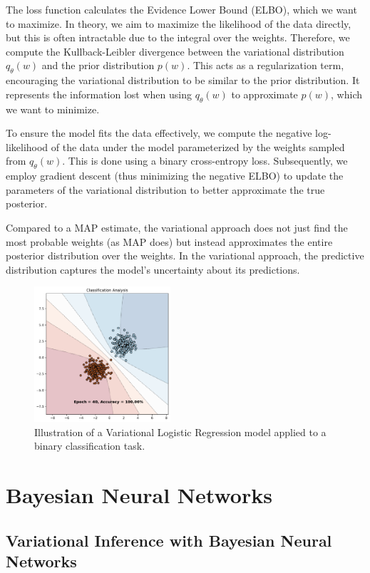 The loss function calculates the Evidence Lower Bound (ELBO), which we want to maximize. In theory, we aim to maximize the likelihood of the data directly, but this is often intractable due to the integral over the weights. Therefore, we compute the Kullback-Leibler divergence between the variational distribution $q_{\theta}(w)$ and the prior distribution $p(w)$. This acts as a regularization term, encouraging the variational distribution to be similar to the prior distribution. It represents the information lost when using $q_{\theta}(w)$ to approximate $p(w)$, which we want to minimize. 

To ensure the model fits the data effectively, we compute the negative log-likelihood of the data under the model parameterized by the weights sampled from $q_{\theta}(w)$. This is done using a binary cross-entropy loss. Subsequently, we employ gradient descent (thus minimizing the negative ELBO) to update the parameters of the variational distribution to better approximate the true posterior.

Compared to a MAP estimate, the variational approach does not just find the most probable weights (as MAP does) but instead approximates the entire posterior distribution over the weights. In the variational approach, the predictive distribution captures the model's uncertainty about its predictions.

\begin{figure}[H]
    \centering
    \includegraphics[width=0.45\textwidth]{logreg_variational.pdf}
    \caption{Illustration of a Variational Logistic Regression model applied to a binary classification task.}
    \label{fig:logreg_variational}
\end{figure}

\section{Bayesian Neural Networks}
\subsection{Variational Inference with Bayesian Neural Networks}
